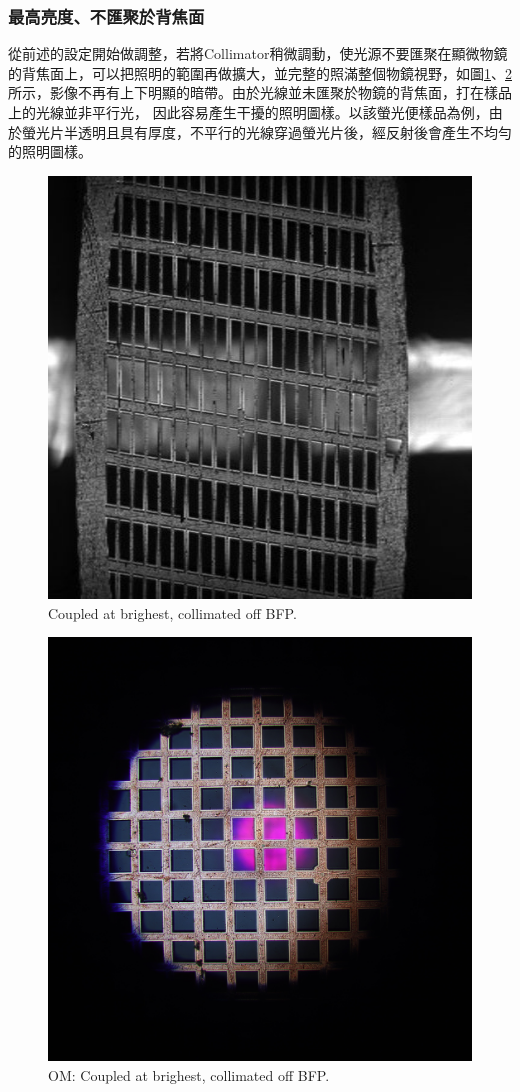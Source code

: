 \documentclass[12pt]{article}
\begin{document}
\subsubsection{最高亮度、不匯聚於背焦面}
從前述的設定開始做調整，若將Collimator稍微調動，使光源不要匯聚在顯微物鏡的背焦面上，可以把照明的範圍再做擴大，並完整的照滿整個物鏡視野，如圖\ref{figure: brightest_off}、\ref{figure: om_brightest_off}所示，影像不再有上下明顯的暗帶。由於光線並未匯聚於物鏡的背焦面，打在樣品上的光線並非平行光，
因此容易產生干擾的照明圖樣。以該螢光便樣品為例，由於螢光片半透明且具有厚度，不平行的光線穿過螢光片後，經反射後會產生不均勻的照明圖樣。
\begin{figure}
    \centering
    \includegraphics[width=0.5\linewidth]{off_brightest.jpg}
    \caption{Coupled at brighest, collimated off BFP.}
    \label{figure: brightest_off}
\end{figure}
\begin{figure}
    \centering
    \includegraphics[width=0.5\linewidth]{om_off_brighest.JPG}
    \caption{OM: Coupled at brighest, collimated off BFP.}
    \label{figure: om_brightest_off}
\end{figure}
\end{document}

